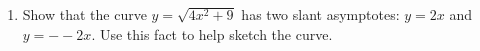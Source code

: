 \documentclass[12pt]{article}
\begin{document}
\begin{enumerate}
\begin{enumerate}
\begin{figure}[!h]
\begin{framed}
                        \end{framed}
                    \end{figure}
                \end{enumerate}
                \setcounter{enumi}{58}
                \item 
                Show that the curve $y = \sqrt{4x^2 + 9}$ has two slant asymptotes: $y = 2x$ and $y = --2x$. Use this fact to help sketch the curve.

\end{enumerate}
\end{document}
